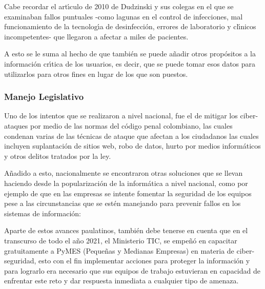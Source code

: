 \begin{displayquote}
	Cabe recordar el art\'{\i}culo de 2010 de Dudzinski y sus colegas en el que se
	examinaban fallos puntuales -como lagunas en el control de infecciones, mal
	funcionamiento de la tecnolog\'{\i}a de desinfecci\'on, errores de laboratorio y
	cl\'{\i}nicos incompetentes- que llegaron a afectar a miles de pacientes.
	\parencite{Banja2020}
\end{displayquote}

A esto se le suma al hecho de que tambi\'en se puede a\~nadir otros prop\'ositos a la
informaci\'on cr\'{\i}tica de los usuarios, es decir, que se puede tomar esos datos
para utilizarlos para otros fines en lugar de los que son puestos.
\parencite{Banja2020}

\subsubsection{Manejo Legislativo}

Uno de los intentos que se realizaron a nivel nacional, fue el de mitigar los
ciber-ataques por medio de las normas del c\'odigo penal colombiano, las cuales
condenan varias de las t\'ecnicas de ataque que afectan a los ciudadanos las
cuales incluyen suplantaci\'on de sitios web, robo de datos, hurto por medios
inform\'aticos y otros delitos tratados por la ley. \parencite[Ley 1273 de 2009.
	Por medio de la cual se modifica el C\'odigo Penal, se crea un nuevo bien jur\'{\i}dico
	tutelado - denominado “de la protecci\'on de la informaci\'on y de los datos”- y se
	preservan integralmente los sistemas que utilicen las tecnolog\'{\i}as de la
	informaci\'on y las comunicaciones, entre otras disposiciones. 5 de enero de 2009.
	D.O. No. 47223, como se cita en][]{Mosquera2019}

A\~nadido a esto, nacionalmente se encontraron otras soluciones que se llevan
haciendo desde la popularizaci\'on de la inform\'atica a nivel nacional, como por
ejemplo de que en las empresas se intente fomentar la seguridad de los equipos
pese a las circunstancias que se est\'en manejando para prevenir fallos en los
sistemas de informaci\'on:

\begin{displayquote}
	Aparte de estos avances paulatinos, tambi\'en debe tenerse en cuenta que en el
	transcurso de todo el a\~no 2021, el Ministerio TIC, se empe\~n\'o en capacitar
	gratuitamente a PyMES (Peque\~nas y Medianas Empresas) en materia de
	ciber-seguridad, esto con el fin implementar acciones para proteger la
	informaci\'on y para lograrlo era necesario que sus equipos de trabajo
	estuvieran en capacidad de enfrentar este reto y dar respuesta inmediata a
	cualquier tipo de amenaza.
	\parencite[MinTic, 2021, como se cita en][]{Bueno2022}
\end{displayquote}

